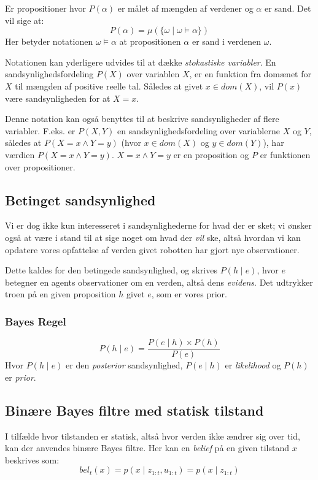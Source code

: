 Er propositioner hvor $P(\alpha)$ er målet af mængden af verdener og $\alpha$ er sand.
Det vil sige at:
$$P(\alpha) = \mu(\{\omega \mid \omega \models \alpha \})$$
Her betyder notationen $\omega \models \alpha$ at propositionen $\alpha$ er sand i verdenen $\omega$.

Notationen kan yderligere udvides til at dække \emph{stokastiske variabler}.
En sandsynlighedsfordeling $P(X)$ over variablen $ X $, er en funktion fra
domænet for $ X $ til mængden af positive reelle tal.
Således at givet $x \in dom(X)$, vil $P(x)$ være sandsynligheden for at $X = x$.

Denne notation kan også benyttes til at beskrive sandsynligheder af flere variabler.
F.eks. er $P(X,Y)$ en sandsynlighedsfordeling over variablerne $ X $ og $ Y $, således at $P(X = x \wedge Y = y)$ (hvor $x \in dom(X)$ og $y \in dom(Y)$), har værdien $P(X = x \wedge Y = y)$.
$X = x \wedge Y = y$ er en proposition og $ P $ er funktionen over propositioner. 

\subsection{Betinget sandsynlighed}
Vi er dog ikke kun interesseret i sandsynlighederne for hvad der er sket; vi ønsker også at være i stand til at sige noget om hvad der \textit{vil} ske, altså hvordan vi kan opdatere vores opfattelse af verden givet robotten har gjort nye observationer.

Dette kaldes for den betingede sandsynlighed, og skrives $P(h \mid e)$, hvor $ e $ betegner en agents observationer om en verden, altså dens \textit{evidens}.
Det udtrykker troen på en given proposition $ h $ givet $ e $, som er vores prior.






\subsubsection{Bayes Regel}

$$P(h \mid e) = \frac{P(e \mid h) \times P(h)}{P(e)}$$
Hvor $P(h \mid e)$ er den \emph{posterior} sandsynlighed, $P(e \mid h)$ er \emph{likelihood} og $P(h)$ er \emph{prior}. 


\subsection{Binære Bayes filtre med statisk tilstand}\label{bayes_binaerfiltre}
I tilfælde hvor tilstanden er statisk, altså hvor verden ikke ændrer sig over tid, kan der anvendes binære Bayes filtre.
Her kan en \textit{belief} på en given tilstand $x$ beskrives som:
\begin{equation}
bel_t(x) = p(x \mid z_{1:t},u_{1:t}) = p(x \mid z_{1:t})
\end{equation}

